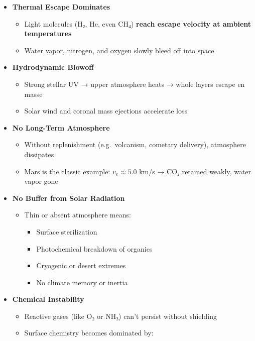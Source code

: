 \documentclass[
  letterpaper,
]{book}
\providecommand{\tightlist}{%
  \setlength{\itemsep}{0pt}\setlength{\parskip}{0pt}}
\begin{document}
\begin{itemize}
\tightlist
\item
  \textbf{Thermal Escape Dominates}

  \begin{itemize}
  \tightlist
  \item
    Light molecules (H₂, He, even CH₄) \textbf{reach escape velocity at
    ambient temperatures}
  \item
    Water vapor, nitrogen, and oxygen slowly bleed off into space
  \end{itemize}
\item
  \textbf{Hydrodynamic Blowoff}

  \begin{itemize}
  \tightlist
  \item
    Strong stellar UV → upper atmosphere heats → whole layers escape en
    masse
  \item
    Solar wind and coronal mass ejections accelerate loss
  \end{itemize}
\item
  \textbf{No Long-Term Atmosphere}

  \begin{itemize}
  \tightlist
  \item
    Without replenishment (e.g.~volcanism, cometary delivery),
    atmosphere dissipates
  \item
    Mars is the classic example: \(v_e ≈ 5.0\) km/s → CO₂ retained
    weakly, water vapor gone
  \end{itemize}
\item
  \textbf{No Buffer from Solar Radiation}

  \begin{itemize}
  \tightlist
  \item
    Thin or absent atmosphere means:

    \begin{itemize}
    \tightlist
    \item
      Surface sterilization
    \item
      Photochemical breakdown of organics
    \item
      Cryogenic or desert extremes
    \item
      No climate memory or inertia
    \end{itemize}
  \end{itemize}
\item
  \textbf{Chemical Instability}

  \begin{itemize}
  \tightlist
  \item
    Reactive gases (like O₂ or NH₃) can't persist without shielding
  \item
    Surface chemistry becomes dominated by:


\end{itemize}
\end{itemize}
\end{document}
